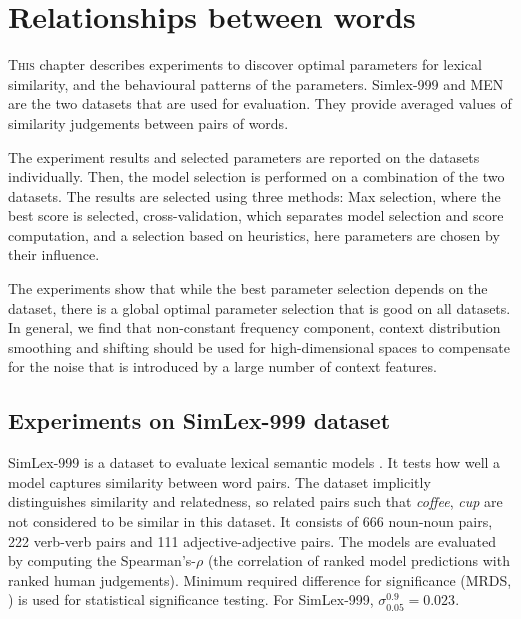 \chapter{Relationships between words}
\label{sec:lexical}

\lettrine[lines=5,loversize=0.25]{T}{his} chapter describes experiments to discover optimal parameters for lexical similarity, and the behavioural patterns of the parameters.\footnotemark{}
 Simlex-999 \cite{hill2014simlex} and MEN \cite{Bruni:2014:MDS:2655713.2655714} are the two datasets that are used for evaluation. They provide averaged values of similarity judgements between pairs of words.

The experiment results and selected parameters are reported on the datasets individually. Then, the model selection is performed on a combination of the two datasets. The results are selected using three methods: Max selection, where the best score is selected, cross-validation, which separates model selection and score computation, and a selection based on heuristics, here parameters are chosen by their influence.

The experiments show that while the best parameter selection depends on the dataset, there is a global optimal parameter selection that is good on all datasets. In general, we find that non-constant frequency component, context distribution smoothing and shifting should be used for high-dimensional spaces to compensate for the noise that is introduced by a large number of context features.

\section{Experiments on SimLex-999 dataset}
\label{sec:simlex-999}

SimLex-999 is a dataset to evaluate lexical semantic models
\cite{hill2014simlex}. It tests how well a model captures similarity between
word pairs. The dataset implicitly distinguishes similarity and relatedness, so
related pairs such that \textit{coffee}, \textit{cup} are not considered to be
similar in this dataset. It consists of 666 noun-noun pairs, 222 verb-verb pairs
and 111 adjective-adjective pairs.  The models are evaluated by computing the
Spearman's-$\rho$ (the correlation of ranked model predictions with ranked human
judgements). Minimum required difference for significance (MRDS,
\citet{rastogi-vandurme-arora:2015:NAACL-HLT}) is used for statistical
significance testing. For SimLex-999, $\sigma^{0.9}_{0.05} = 0.023$.\footnotemark{}

